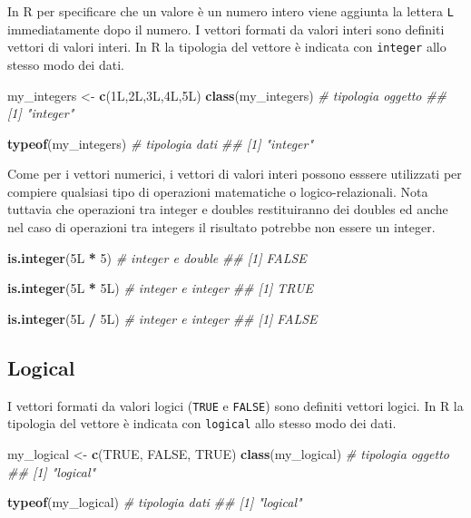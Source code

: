 \documentclass[
]{book}
\newenvironment{Shaded}{\begin{snugshade}}{\end{snugshade}}
\newcommand{\CommentTok}[1]{\textcolor[rgb]{0.56,0.35,0.01}{\textit{#1}}}
\newcommand{\DecValTok}[1]{\textcolor[rgb]{0.00,0.00,0.81}{#1}}
\newcommand{\KeywordTok}[1]{\textcolor[rgb]{0.13,0.29,0.53}{\textbf{#1}}}
\newcommand{\NormalTok}[1]{#1}
\newcommand{\OperatorTok}[1]{\textcolor[rgb]{0.81,0.36,0.00}{\textbf{#1}}}
\newcommand{\OtherTok}[1]{\textcolor[rgb]{0.56,0.35,0.01}{#1}}
\newcommand{\StringTok}[1]{\textcolor[rgb]{0.31,0.60,0.02}{#1}}
\begin{document}
In R per specificare che un valore è un numero intero viene aggiunta la lettera \texttt{L} immediatamente dopo il numero. I vettori formati da valori interi sono definiti vettori di valori interi. In R la tipologia del vettore è indicata con \texttt{integer} allo stesso modo dei dati.

\begin{Shaded}
\begin{Highlighting}[]
\NormalTok{my_integers <-}\StringTok{ }\KeywordTok{c}\NormalTok{(1L,2L,3L,4L,5L)}
\KeywordTok{class}\NormalTok{(my_integers)  }\CommentTok{# tipologia oggetto}
\CommentTok{## [1] "integer"}

\KeywordTok{typeof}\NormalTok{(my_integers) }\CommentTok{# tipologia dati}
\CommentTok{## [1] "integer"}
\end{Highlighting}
\end{Shaded}

Come per i vettori numerici, i vettori di valori interi possono esssere utilizzati per compiere qualsiasi tipo di operazioni matematiche o logico-relazionali. Nota tuttavia che operazioni tra integer e doubles restituiranno dei doubles ed anche nel caso di operazioni tra integers il risultato potrebbe non essere un integer.

\begin{Shaded}
\begin{Highlighting}[]
\KeywordTok{is.integer}\NormalTok{(5L }\OperatorTok{*}\StringTok{ }\DecValTok{5}\NormalTok{)   }\CommentTok{# integer e double}
\CommentTok{## [1] FALSE}

\KeywordTok{is.integer}\NormalTok{(5L }\OperatorTok{*}\StringTok{ }\NormalTok{5L)  }\CommentTok{# integer e integer}
\CommentTok{## [1] TRUE}

\KeywordTok{is.integer}\NormalTok{(5L }\OperatorTok{/}\StringTok{ }\NormalTok{5L)  }\CommentTok{# integer e integer}
\CommentTok{## [1] FALSE}
\end{Highlighting}
\end{Shaded}

\hypertarget{logical-vector}{%
\subsection{Logical}\label{logical-vector}}

I vettori formati da valori logici (\texttt{TRUE} e \texttt{FALSE}) sono definiti vettori logici. In R la tipologia del vettore è indicata con \texttt{logical} allo stesso modo dei dati.

\begin{Shaded}
\begin{Highlighting}[]
\NormalTok{my_logical <-}\StringTok{ }\KeywordTok{c}\NormalTok{(}\OtherTok{TRUE}\NormalTok{, }\OtherTok{FALSE}\NormalTok{, }\OtherTok{TRUE}\NormalTok{)}
\KeywordTok{class}\NormalTok{(my_logical)  }\CommentTok{# tipologia oggetto}
\CommentTok{## [1] "logical"}

\KeywordTok{typeof}\NormalTok{(my_logical) }\CommentTok{# tipologia dati}
\CommentTok{## [1] "logical"}
\end{Highlighting}
\end{Shaded}
\end{document}
